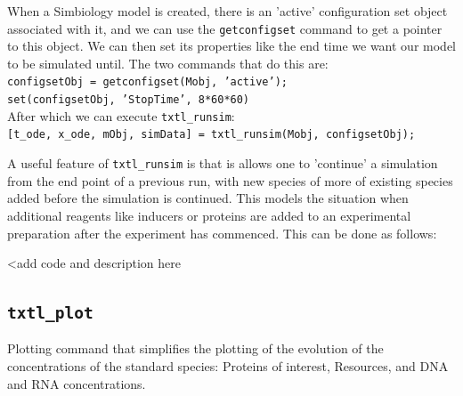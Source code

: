 \documentclass[english]{report}
\begin{document}
			\vspace{1\baselineskip}
			When a Simbiology model is created, there is an 'active' configuration set object associated with it, and we can use the \texttt{getconfigset} command to get a pointer to this object. We can then set its properties like the end time we want our model to be simulated until. The two commands that do this are: \\
\texttt{configsetObj = getconfigset(Mobj, 'active');} \\
\texttt{set(configsetObj, 'StopTime', 8*60*60)} \\

After which we can execute \texttt{txtl\_runsim}: \\
\texttt{[t\_ode, x\_ode, mObj, simData] = txtl\_runsim(Mobj, configsetObj);} 

\vspace{1\baselineskip}
A useful feature of \texttt{txtl\_runsim} is that is allows one to 'continue' a simulation from the end point of a previous run, with new species of more of existing species added before the simulation is continued. This models the situation when additional reagents like inducers or proteins are added to an experimental preparation after the experiment has commenced. This can be done as follows: 

{\color{red} <add code and description here}
\vspace{3\baselineskip}

		\subsection*{\texttt{txtl\_plot}}
		Plotting command that simplifies the plotting of the evolution of the concentrations of the standard species: Proteins of interest, Resources, and DNA and RNA concentrations. \\
		
\end{document}
